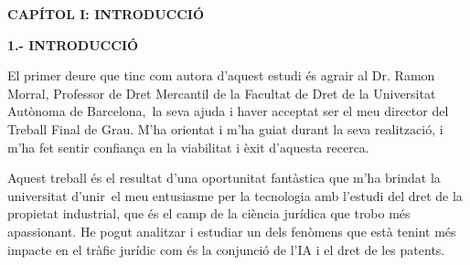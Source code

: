 \documentclass[12pt]{article}
\begin{document}
\vspace{\baselineskip}

\vspace{\baselineskip}

\vspace{\baselineskip}

\vspace{\baselineskip}

\vspace{\baselineskip}

\vspace{\baselineskip}

\vspace{\baselineskip}

\vspace{\baselineskip}

\vspace{\baselineskip}

\vspace{\baselineskip}
\begin{Center}
{\fontsize{16pt}{19.2pt}\selectfont \textbf{CAPÍTOL I: INTRODUCCIÓ}\par}
\end{Center}\par


\vspace{\baselineskip}
\begin{justify}
\textbf{1.- INTRODUCCIÓ}
\end{justify}\par


\vspace{\baselineskip}
\begin{justify}
El primer deure que tinc com autora d’aquest estudi és agrair al Dr. Ramon Morral, Professor de Dret Mercantil de la Facultat de Dret de la Universitat Autònoma de Barcelona,\  la seva ajuda i haver acceptat ser el meu director del Treball Final de Grau. M’ha orientat i m’ha guiat durant la seva realització, i m’ha fet sentir confiança en la viabilitat i èxit d’aquesta recerca.
\end{justify}\par


\vspace{\baselineskip}
\begin{justify}
Aquest treball és el resultat d’una oportunitat fantàstica que m’ha brindat la universitat d’unir\ el meu entusiasme per la tecnologia amb l’estudi del dret de la propietat industrial, que és el camp de la ciència jurídica que trobo més apassionant.  He pogut analitzar i estudiar un dels fenòmens que està tenint més impacte en el tràfic jurídic com és la conjunció de l’IA i el dret de les patents. 
\end{justify}\par
\end{document}
